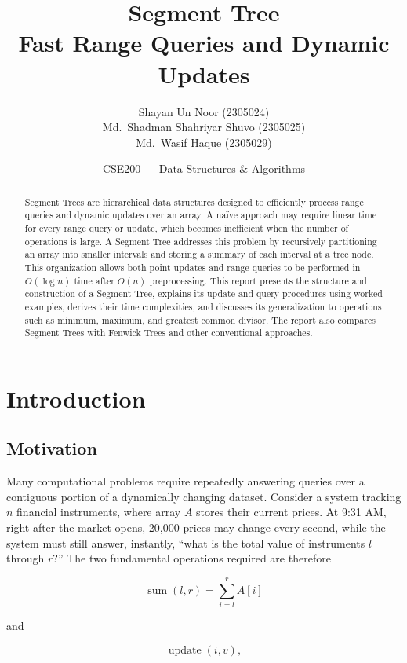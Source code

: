 \documentclass[11pt]{article}
\title{\textbf{\Large Segment Tree}\\[4pt]\large Fast Range Queries and Dynamic Updates}
\author{Shayan Un Noor (2305024) \\ Md.\ Shadman Shahriyar Shuvo (2305025) \\ Md.\ Wasif Haque (2305029)}
\date{CSE200 --- Data Structures \& Algorithms}
\begin{document}
\maketitle

\begin{abstract}
\noindent Segment Trees are hierarchical data structures designed to efficiently process range queries and dynamic updates over an array. A na\"ive approach may require linear time for every range query or update, which becomes inefficient when the number of operations is large. A Segment Tree addresses this problem by recursively partitioning an array into smaller intervals and storing a summary of each interval at a tree node. This organization allows both point updates and range queries to be performed in $O(\log n)$ time after $O(n)$ preprocessing. This report presents the structure and construction of a Segment Tree, explains its update and query procedures using worked examples, derives their time complexities, and discusses its generalization to operations such as minimum, maximum, and greatest common divisor. The report also compares Segment Trees with Fenwick Trees and other conventional approaches.
\end{abstract}

\section{Introduction}

\subsection{Motivation}
Many computational problems require repeatedly answering queries over a contiguous portion of a dynamically changing dataset. Consider a system tracking $n$ financial instruments, where array $A$ stores their current prices. At 9:31 AM, right after the market opens, 20{,}000 prices may change every second, while the system must still answer, instantly, ``what is the total value of instruments $l$ through $r$?'' The two fundamental operations required are therefore

\begin{equation}
\operatorname{sum}(l,r) = \sum_{i=l}^{r} A[i]
\label{eq:sum}
\end{equation}

and

\begin{equation}
\operatorname{update}(i,v),
\label{eq:update}
\end{equation}
\end{document}

